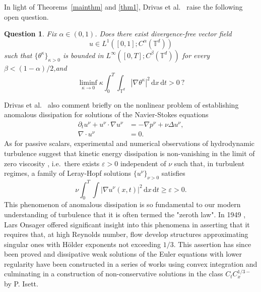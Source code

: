 \documentclass[12pt]{report}   %
\renewcommand{\geq}{\geqslant}
\numberwithin{equation}{section}
\theoremstyle{plain}
\newtheorem{question}[lemma]{Question}
\theoremstyle{definition}
\theoremstyle{remark}
\newcommand{\ve}{\varepsilon}
\newcommand{\rmd}{\, \mathrm{d}}
\begin{document}
In light of Theorems~\ref{mainthm} and \ref{thm1}, Drivas et al.\ \cite{DrivasElgindiEA22} raise the following open question.
\begin{question}
  Fix $\alpha\in (0,1)$.
  Does there exist divergence-free vector field
  \begin{equation*}
    u\in   L^1([0,1]; C^\alpha(\mathbb{T}^d))
  \end{equation*} such that $\{\theta^\kappa\}_{\kappa>0}$ is bounded in $L^\infty([0,T] ; C^\beta(\mathbb{T}^d))$ for every $\beta<(1-\alpha)/2$,and
\begin{equation*}
\liminf_{\kappa\to 0} \kappa \int_0^T \int_{\mathbb{T}^d} |\nabla \theta^\kappa|^2 \rmd x \rmd t>0 \ ?
\end{equation*}
\end{question}

Drivas et al.\ \cite{DrivasElgindiEA22} also comment briefly on the nonlinear problem of establishing anomalous dissipation for solutions of the Navier-Stokes equations
\begin{align*}
\partial_t u^\nu + u^\nu \cdot \nabla u^\nu &= -\nabla p^\nu + \nu \Delta u^\nu,\\
\nabla \cdot u^\nu &= 0.
\end{align*}
As for passive scalars, experimental and numerical observations of hydrodynamic turbulence suggest that kinetic energy dissipation is non-vanishing in the limit of zero viscosity \cite{Sreenivasan84,Sreenivasan98,PearsonKrogstadEA02,KanedaIshiharaEA03}, i.e.\ there exists $\ve>0$ independent of $\nu$ such that, in turbulent regimes, a family of Leray-Hopf solutions $\{u^\nu \}_{\nu>0}$ satisfies
\begin{equation}\label{anomalousdissNS}
\nu\int_0^T  \int  \!  |\nabla u^\nu(x,t)|^2 \rmd x \rmd t \geq \varepsilon >0.
\end{equation}
This phenomenon of anomalous dissipation is so fundamental to our modern understanding of turbulence that it is often termed the "zeroth law".  In 1949 \cite{Onsager49}, Lars Onsager offered significant insight 
into this phenomena in asserting that  it requires that, at high Reynolds number, flow develop  structures approximating singular ones with
H\"{o}lder exponents not exceeding $1/3$.  This assertion has since been proved \cite{Eyink94,ConstantinEEA94} and dissipative weak solutions of the Euler equations with lower regularity have been constructed in a series of works using  convex integration  \cite{DeLellisSzekelyhidi09,DeLellisSzekelyhidi10,DeLellisSzekelyhidi12,Isett18,BuckmasterDeLellisEA19} and culminating in a construction of non-conservative solutions in the class $C_t C^{1/3-}_x$ by P. Isett.
\end{document}
